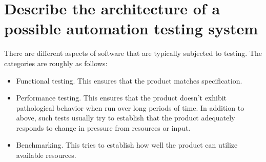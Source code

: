 \documentclass[11pt]{article}
\author{wvxvw}
\date{\today}
\title{}
\begin{document}
\section{Describe the architecture of a possible automation testing system}
\label{sec:orgf024ab3}
There are different aspects of software that are typically subjected
to testing.  The categories are roughly as follows:
\begin{itemize}
\item Functional testing.  This ensures that the product matches
specification.
\item Performance testing.  This ensures that the product doesn't
exhibit pathological behavior when run over long periods of time.
In addition to above, such tests usually try to establish that the
product adequately responds to change in pressure from resources
or input.
\item Benchmarking.  This tries to establish how well the product can
utilize available resources.
\end{itemize}
\end{document}
